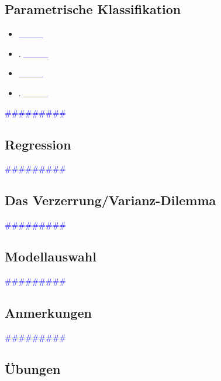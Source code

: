 \documentclass{article}
\begin{document}
  \subsection{Parametrische Klassifikation} %
      \begin{itemize}
      \color{red}
        \item  \textcolor{blue}{\_\_\_\_}
        \item. \textcolor{blue}{\_\_\_\_}
      \color{ForestGreen}
        \item  \textcolor{blue}{\_\_\_\_}
        \item. \textcolor{blue}{\_\_\_\_}
      \end{itemize}
      \textcolor{blue}{\#\#\#\#\#\#\#\#\#}
  \subsection{Regression} %
      \textcolor{blue}{\#\#\#\#\#\#\#\#\#}
  \subsection{Das Verzerrung/Varianz-Dilemma} %

      \textcolor{blue}{\#\#\#\#\#\#\#\#\#}
  \subsection{Modellauswahl} %

      \textcolor{blue}{\#\#\#\#\#\#\#\#\#}
  \subsection{Anmerkungen} %

      \textcolor{blue}{\#\#\#\#\#\#\#\#\#}
  \subsection{Übungen} %
\end{document}
